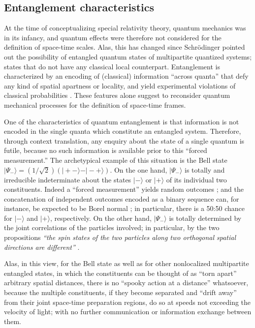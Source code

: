 \documentclass[%
  preprint,
 showpacs,
 showkeys,
 preprintnumbers,
 amsmath,amssymb,
 aps,
  pra,
  longbibliography,
 ]{revtex4-1}
\begin{document}
\subsection{Entanglement characteristics}

At the time of conceptualizing special relativity theory, quantum mechanics was in its infancy,
and quantum effects were therefore not considered for the definition of space-time scales.
Alas, this has changed since Schr\"odinger pointed out the possibility of entangled quantum states of multipartite quantized systems;
states that do not have any classical local counterpart.
Entanglement is characterized by an encoding of (classical) information ``across quanta'' \cite{zeil-99,zeil-Zuk-bruk-01,svozil-2002-statepart-prl}
that defy any kind of spatial apartness or locality,
and yield experimental violations \cite{wjswz-98} of classical probabilities \cite{pitowsky}.
These features alone suggest to reconsider quantum mechanical processes for the definition of space-time frames.

One of the characteristics of quantum entanglement is that information is not encoded in the single quanta which constitute
an entangled system. Therefore, through context translation, any enquiry about the state of a single quantum
is futile, because no such information is available prior to this ``forced measurement.''
The archetypical example of this situation is the Bell state
$\vert \Psi_- \rangle = \left( 1/\sqrt{2} \right) \left(\vert +-\rangle - \vert -+\rangle \right)$.
On the one hand, $\vert \Psi_- \rangle$ is totally and irreducible indeterminate about the states $\vert -\rangle$ or $\vert +\rangle$
of its individual two constituents.
Indeed a ``forced measurement'' yields random outcomes \cite{svozil-qct}; and the concatenation of independent outcomes
encoded as a binary sequence can, for instance, be expected to be Borel normal
\cite{svozil-2006-ran,PhysRevA.82.022102}; in particular, there is a 50:50 chance for  $\vert -\rangle$ and $\vert +\rangle$, respectively.
On the other hand, $\vert \Psi_- \rangle$ is totally determined by the joint correlations of the particles involved;
in particular, by the two propositions  {\em ``the spin states of the two particles along two orthogonal spatial directions
are different''}   \cite{Zeilinger-97,zeil-99,svozil-2002-statepart-prl}.

Alas, in this view,
for the Bell state as well as for other nonlocalized multipartite entangled states,
in which the constituents can be thought of as ``torn apart'' arbitrary spatial distances,
there is no ``spooky action at a distance'' \cite{Nikolic} whatsoever,
because the multiple constituents, if they become separated and ``drift away'' from their joint space-time preparation regions,
do so at speeds not exceeding the velocity of light; with no further communication or information exchange between them.
\end{document}
